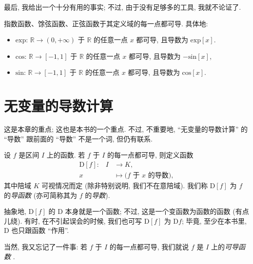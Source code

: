 最后, 我给出一个十分有用的事实;
不过, 由于没有足够多的工具, 我就不论证了.

\begin{theorem}
    指数函数、馀弦函数、正弦函数于其定义域的每一点都可导.
    具体地:
    \begin{itemize}
        \item $\mathrm{exp}$: $\mathbb{R} \to (0, +\infty)$
              于 $\mathbb{R}$ 的任意一点 $x$ 都可导,
              且导数为 $\mathrm{exp} [x]$.
        \item $\mathrm{cos}$: $\mathbb{R} \to [-1, 1]$
              于 $\mathbb{R}$ 的任意一点 $x$ 都可导,
              且导数为 $-\mathrm{sin} [x]$,
        \item $\mathrm{sin}$: $\mathbb{R} \to [-1, 1]$
              于 $\mathbb{R}$ 的任意一点 $x$ 都可导,
              且导数为 $\mathrm{cos} [x]$.
    \end{itemize}
\end{theorem}

\section{无变量的导数计算}

这是本章的重点; 这也是本书的一个重点.
不过, 不重要地,
``无变量的导数计算'' 的 ``导数''
跟前面的 ``导数'' 不是一个词,
但仍有联系.

\begin{definition}
    设 $f$ 是区间 $I$ 上的函数.
    若 $f$ 于 $I$ 的每一点都可导, 则定义函数
    \begin{align*}
        \text{$\mathrm{D}[f]$:} \quad
        I & \to K,                          \\
        x & \mapsto \text{($f$ 于 $x$ 的导数)},
    \end{align*}
    其中陪域 $K$ 可视情况而定
    (除非特别说明, 我们不在意陪域).
    我们称 $\mathrm{D}[f]$ 为 $f$ 的\emph{导函数}%
    (亦可简称其为 $f$ 的\emph{导数}).
\end{definition}

抽象地, $\mathrm{D}[f]$ 的 $\mathrm{D}$ 本身就是一个函数;
不过, 这是一个变函数为函数的函数 (有点儿绕).
有时, 在不引起误会的时候,
我们也可写 $\mathrm{D}[f]$ 为 $\mathrm{D}f$;
毕竟, 至少在本书里, $\mathrm{D}$ 也只跟函数 ``作用''.

当然, 我又忘记了一件事:
若 $f$ 于 $I$ 的每一点都可导,
我们就说 $f$ 是 $I$ 上的\emph{可导函数}%
.

